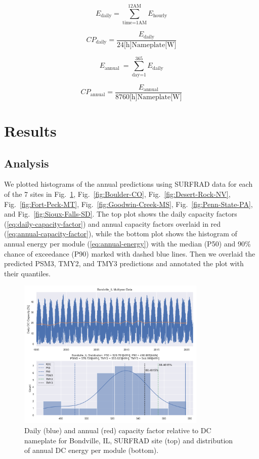 \documentclass[conference]{IEEEtran}
\begin{document}
\begin{equation}
E_\text{daily} = \sum_\text{time=1AM}^\text{12AM}{E_\text{hourly}} \label{eq:daily-energy}
\end{equation}

\begin{equation}
\mathit{CP}_\text{daily} = \frac{E_\text{daily}}{ 24\text{[h]} \text{Nameplate[W]} } \label{eq:daily-capacity-factor}
\end{equation}

\begin{equation}
E_\text{annual }= \sum_\text{day=1}^\text{365}{E_\text{daily}} \label{eq:annual-energy}
\end{equation}

\begin{equation}
\mathit{CP}_\text{annual} = \frac{E_\text{annual}}{ 8760\text{[h]} \text{Nameplate[W]} } \label{eq:annual-capacity-factor}
\end{equation}

\section{Results}
\label{section:results}

\subsection{Analysis}
We plotted histograms of the annual predictions using SURFRAD data for each of the 7 sites in Fig.~\ref{fig:Bondville-IL}, Fig.~\ref{fig:Boulder-CO}, Fig.~\ref{fig:Desert-Rock-NV}, Fig.~\ref{fig:Fort-Peck-MT}, Fig.~\ref{fig:Goodwin-Creek-MS}, Fig.~\ref{fig:Penn-State-PA}, and Fig.~\ref{fig:Sioux-Falls-SD}. The top plot shows the daily capacity factors (\ref{eq:daily-capacity-factor}) and annual capacity factors overlaid in red (\ref{eq:annual-capacity-factor}), while the bottom plot shows the histogram of annual energy per module (\ref{eq:annual-energy}) with the median (P50) and 90\% chance of exceedance (P90) marked with dashed blue lines. Then we overlaid the predicted PSM3, TMY2, and TMY3 predictions and annotated the plot with their quantiles.

\begin{figure}[htbp]
\centerline{\includegraphics[width=9cm]{Bondville_IL.png}}
\caption{Daily (blue) and annual (red) capacity factor relative to DC nameplate for Bondville, IL, SURFRAD site (top) and distribution of annual DC energy per module (bottom).}
\label{fig:Bondville-IL}
\end{figure}
\end{document}
